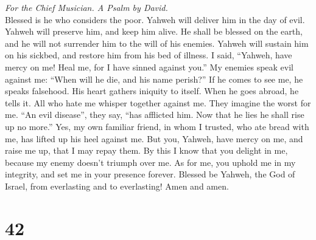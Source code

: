 \emph{For the Chief Musician. A Psalm by David.}\\
 Blessed is he who considers the poor. Yahweh will deliver
him in the day of evil.  Yahweh will preserve him, and
keep him alive. He shall be blessed on the earth, and he will not
surrender him to the will of his enemies.  Yahweh will
sustain him on his sickbed, and restore him from his bed of illness.
 I said, ``Yahweh, have mercy on me! Heal me, for I have
sinned against you.''  My enemies speak evil against me:
``When will he die, and his name perish?''  If he comes to
see me, he speaks falsehood. His heart gathers iniquity to itself. When
he goes abroad, he tells it.  All who hate me whisper
together against me. They imagine the worst for me.  ``An
evil disease'', they say, ``has afflicted him. Now that he lies he shall
rise up no more.''  Yes, my own familiar friend, in whom I
trusted, who ate bread with me, has lifted up his heel against me.
 But you, Yahweh, have mercy on me, and raise me up, that
I may repay them.  By this I know that you delight in me,
because my enemy doesn't triumph over me.  As for me, you
uphold me in my integrity, and set me in your presence forever.
 Blessed be Yahweh, the God of Israel, from everlasting
and to everlasting! Amen and amen.

\hypertarget{section-41}{%
\section{42}\label{section-41}}

